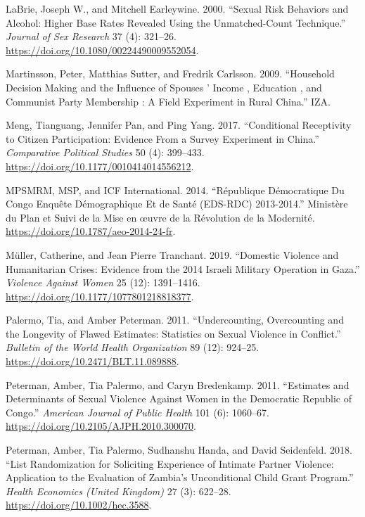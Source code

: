 \documentclass[
]{article}
\newlength{\cslhangindent}
\newenvironment{CSLReferences}[2] %
 {\begin{list}{}{%
  \setlength{\itemindent}{0pt}
  \setlength{\leftmargin}{0pt}
  \setlength{\parsep}{0pt}
  \ifodd #1
   \setlength{\leftmargin}{\cslhangindent}
   \setlength{\itemindent}{-1\cslhangindent}
  \fi
  \setlength{\itemsep}{#2\baselineskip}}}
 {\end{list}}
\begin{document}
\begin{CSLReferences}{1}{0}
LaBrie, Joseph W., and Mitchell Earleywine. 2000. {``Sexual Risk
Behaviors and Alcohol: {Higher} Base Rates Revealed Using the
Unmatched-Count Technique.''} \emph{Journal of Sex Research} 37 (4):
321--26. \url{https://doi.org/10.1080/00224490009552054}.

Martinsson, Peter, Matthias Sutter, and Fredrik Carlsson. 2009.
{``Household {Decision Making} and the {Influence} of {Spouses} '
{Income} , {Education} , and {Communist Party Membership} : {A Field
Experiment} in {Rural China}.''} {IZA}.

Meng, Tianguang, Jennifer Pan, and Ping Yang. 2017. {``Conditional
{Receptivity} to {Citizen Participation}: {Evidence From} a {Survey
Experiment} in {China}.''} \emph{Comparative Political Studies} 50 (4):
399--433. \url{https://doi.org/10.1177/0010414014556212}.

MPSMRM, MSP, and ICF International. 2014. {``R{é}publique
{D{é}mocratique} Du {Congo Enqu{ê}te D{é}mographique} Et de {Sant{é}}
({EDS-RDC}) 2013-2014.''} {Minist{è}re du Plan et Suivi de la Mise en
{œ}uvre de la R{é}volution de la Modernit{é}}.
\url{https://doi.org/10.1787/aeo-2014-24-fr}.

Müller, Catherine, and Jean Pierre Tranchant. 2019. {``Domestic
{Violence} and {Humanitarian Crises}: {Evidence} from the 2014 {Israeli
Military Operation} in {Gaza}.''} \emph{Violence Against Women} 25 (12):
1391--1416. \url{https://doi.org/10.1177/1077801218818377}.

Palermo, Tia, and Amber Peterman. 2011. {``Undercounting, Overcounting
and the Longevity of Flawed Estimates: {Statistics} on Sexual Violence
in Conflict.''} \emph{Bulletin of the World Health Organization} 89
(12): 924--25. \url{https://doi.org/10.2471/BLT.11.089888}.

Peterman, Amber, Tia Palermo, and Caryn Bredenkamp. 2011. {``Estimates
and Determinants of Sexual Violence Against Women in the {Democratic
Republic} of {Congo}.''} \emph{American Journal of Public Health} 101
(6): 1060--67. \url{https://doi.org/10.2105/AJPH.2010.300070}.

Peterman, Amber, Tia Palermo, Sudhanshu Handa, and David Seidenfeld.
2018. {``List Randomization for Soliciting Experience of Intimate
Partner Violence: {Application} to the Evaluation of {Zambia}'s
Unconditional Child Grant Program.''} \emph{Health Economics (United
Kingdom)} 27 (3): 622--28. \url{https://doi.org/10.1002/hec.3588}.


\end{CSLReferences}
\end{document}
